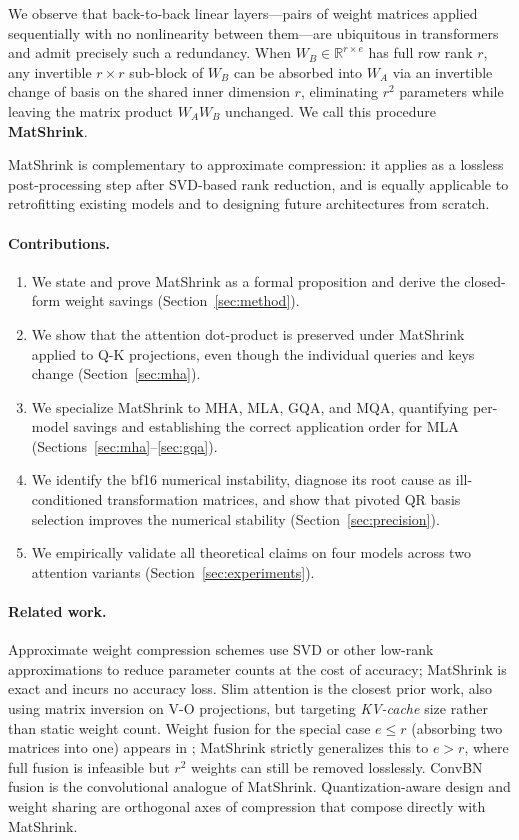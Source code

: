 \documentclass{article}
\begin{document}
We observe that back-to-back linear layers---pairs of weight matrices applied sequentially with no nonlinearity between them---are ubiquitous in transformers and admit precisely such a redundancy. When $W_B \in \mathbb{R}^{r \times e}$ has full row rank $r$, any invertible $r \times r$ sub-block of $W_B$ can be absorbed into $W_A$ via an invertible change of basis on the shared inner dimension $r$, eliminating $r^2$ parameters while leaving the matrix product $W_A W_B$ unchanged. We call this procedure \textbf{MatShrink}.

MatShrink is complementary to approximate compression: it applies as a lossless post-processing step after SVD-based rank reduction, and is equally applicable to retrofitting existing models and to designing future architectures from scratch.

\paragraph{Contributions.}
\begin{enumerate}[topsep=2pt, itemsep=1pt]
  \item We state and prove MatShrink as a formal proposition and derive the closed-form weight savings (Section~\ref{sec:method}).
  \item We show that the attention dot-product is preserved under MatShrink applied to Q-K projections, even though the individual queries and keys change (Section~\ref{sec:mha}).
  \item We specialize MatShrink to MHA, MLA, GQA, and MQA, quantifying per-model savings and establishing the correct application order for MLA (Sections~\ref{sec:mha}--\ref{sec:gqa}).
  \item We identify the bf16 numerical instability, diagnose its root cause as ill-conditioned transformation matrices, and show that pivoted QR basis selection improves the numerical stability (Section~\ref{sec:precision}).
  \item We empirically validate all theoretical claims on four models across two attention variants (Section~\ref{sec:experiments}).
\end{enumerate}

\paragraph{Related work.}
Approximate weight compression schemes \citep{MoDeGPT,laser} use SVD or other low-rank approximations to reduce parameter counts at the cost of accuracy; MatShrink is exact and incurs no accuracy loss. Slim attention \citep{slimAttn} is the closest prior work, also using matrix inversion on V-O projections, but targeting \emph{KV-cache} size rather than static weight count. Weight fusion for the special case $e \leq r$ (absorbing two matrices into one) appears in \cite{remove,marko}; MatShrink strictly generalizes this to $e > r$, where full fusion is infeasible but $r^2$ weights can still be removed losslessly. ConvBN fusion \citep{convBN} is the convolutional analogue of MatShrink. Quantization-aware design \citep{smoothQuant} and weight sharing are orthogonal axes of compression that compose directly with MatShrink.
\end{document}
